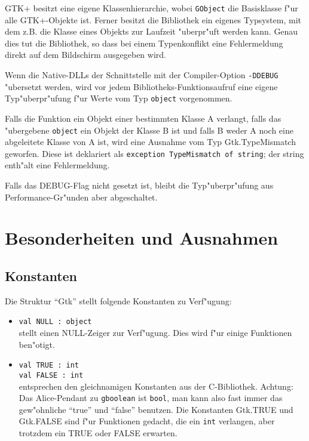 \documentclass{article}
\begin{document}
GTK+ besitzt eine eigene Klassenhierarchie, wobei \texttt{GObject} die
Basisklasse f"ur alle GTK+-Objekte ist. Ferner besitzt die Bibliothek ein
eigenes Typsystem, mit dem z.B. die Klasse eines Objekts zur Laufzeit 
"uberpr"uft werden kann. Genau dies tut die Bibliothek, so dass bei einem
Typenkonflikt eine Fehlermeldung direkt auf dem Bildschirm ausgegeben wird.

Wenn die Native-DLLs der Schnittstelle mit der Compiler-Option \texttt{-DDEBUG}
"ubersetzt werden, wird vor jedem Bibliotheks-Funktionsaufruf eine eigene
Typ"uberpr"ufung f"ur Werte vom Typ \texttt{object} vorgenommen.

Falls die Funktion ein Objekt einer bestimmten Klasse A
verlangt, falls das "ubergebene \texttt{object} ein Objekt der Klasse B ist
und falls B weder A noch eine abgeleitete Klasse von A ist, wird eine Ausnahme
vom Typ Gtk.TypeMismatch geworfen. Diese ist deklariert als
\texttt{exception TypeMismatch of string}; der string enth"alt eine
Fehlermeldung.

Falls das DEBUG-Flag nicht gesetzt ist, bleibt die Typ"uberpr"ufung aus
Performance-Gr"unden aber abgeschaltet.



\section{Besonderheiten und Ausnahmen}

\subsection{Konstanten}

Die Struktur ``Gtk'' stellt folgende Konstanten zu Verf"ugung:
\begin{itemize}
\item \texttt{val NULL : object}\\
      stellt einen NULL-Zeiger zur Verf"ugung. Dies wird f"ur einige Funktionen
      ben"otigt.
\item \texttt{val TRUE : int}\\
      \texttt{val FALSE : int}\\
      entsprechen den gleichnamigen Konstanten aus der C-Bibliothek.
      Achtung: Das Alice-Pendant zu \texttt{gboolean} ist \texttt{bool}, man
      kann also fast immer das gew"ohnliche ``true'' und ``false'' benutzen.
      Die Konstanten Gtk.TRUE und Gtk.FALSE sind f"ur Funktionen gedacht, die
      ein \texttt{int} verlangen, aber trotzdem ein TRUE oder FALSE erwarten.
\end{itemize}
\end{document}
